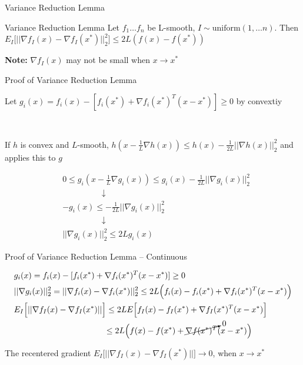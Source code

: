 \documentclass[aspectratio=169,xcolor=dvipsnames]{beamer}
\begin{document}

\begin{frame}{Variance Reduction Lemma}

\begin{block}{Variance Reduction Lemma}
	Let $f_1 \ldots f_n$ be L-smooth, $I \sim \text{uniform}(1,\ldots n)$.
	Then $E_I\Big[|| \nabla f_I(x) - \nabla f_I(x^*)  ||_2^2\Big] \le 2L (f(x) - f(x^*))$
\end{block}

\textbf{Note:} $\nabla f_I(x)$ may not be small when $x \to x^*$

\end{frame}



\begin{frame}{Proof of Variance Reduction Lemma}

Let $g_i(x) = f_i(x) - [ f_i(x^*) + \nabla f_i(x^*)^T(x - x^*) ] \ge 0$ by convextiy

\

If $h$ is convex and $L$-smooth, $h(x - \frac{1}{L} \nabla h(x) ) \le h(x) - \frac{1}{2L}||\nabla h(x)||_2^2$ and applies this to $g$

\begin{align*}
	&0 \le g_i(x - \frac{1}{L} \nabla g_i(x) ) \le g_i(x) - \frac{1}{2L}||\nabla g_i(x)||_2^2 \\
	&\hspace{2cm} \downarrow\\
	&-g_i(x) \le - \frac{1}{2L}||\nabla g_i(x)||_2^2 \\
	&\hspace{2cm} \downarrow\\
	&||\nabla g_i(x)||_2^2  \le 2L g_i(x)
\end{align*}
	
\end{frame}





\begin{frame}{Proof of Variance Reduction Lemma -- Continuous}


\begin{align*}
	&g_i(x) = f_i(x) - [ f_i(x^*) + \nabla f_i(x^*)^T(x - x^*) ] \ge 0 \\
	&||\nabla g_i(x)||_2^2 = || \nabla f_i(x) - \nabla f_i(x^*)||_2^2 \le 2L \Big(f_i(x) - f_i(x^*) + \nabla f_i(x^*)^T(x - x^*) \Big)\\
	& E_I\Big[||\nabla f_I(x) - \nabla f_I(x^*)||\Big] \le 2L E\Big[ f_I(x) - f_I(x^*) + \nabla f_I(x^*)^T(x - x^*) \Big]\\
	& \hspace{38.5mm} \le 2L\Big( f(x) - f(x^*) + \cancelto{0}{\nabla f(x^*)^T} (x - x^*) \Big) 
\end{align*}

The recentered gradient $E_I\Big[||\nabla f_I(x) - \nabla f_I(x^*)||\Big] \to 0$, when $x \to x^*$

\end{frame}
\end{document}
